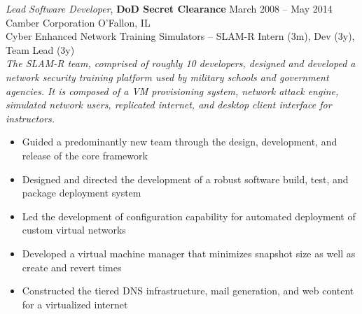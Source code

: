 \documentclass[margin,line]{resume}
\begin{document}
\begin{resume}
{\sl Lead Software Developer}, \textbf{\small DoD Secret Clearance}  \hfill  March 2008 -- May 2014\\
Camber Corporation                                                   \hfill  O'Fallon, IL\\
{\small Cyber Enhanced Network Training Simulators -- SLAM-R  \hfill  Intern (3m), Dev (3y), Team Lead (3y)}\\
{\small\textit{The SLAM-R team, comprised of roughly 10 developers, designed and developed a network security training
platform used by military schools and government agencies. It is composed of a VM provisioning system, network attack
engine, simulated network users, replicated internet, and desktop client interface for instructors.}}
\begin{itemize} \itemsep -2pt %
\small\item Guided a predominantly new team through the design, development, and release of the core framework
\small\item Designed and directed the development of a robust software build, test, and package deployment system
\small\item Led the development of configuration capability for automated deployment of custom virtual networks
\small\item Developed a virtual machine manager that minimizes snapshot size as well as create and revert times
\small\item Constructed the tiered DNS infrastructure, mail generation, and web content for a virtualized internet

\end{itemize}
\end{resume}
\end{document}
